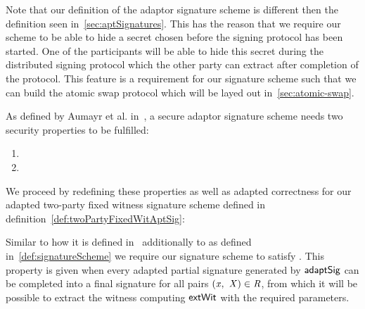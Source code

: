Note that our definition of the adaptor signature scheme is different then the definition seen in~\ref{sec:aptSignatures}. This has the reason that we require our scheme to be able to hide a secret chosen before
the signing protocol has been started. One of the participants will be able to hide this secret during the distributed signing protocol which the other party can extract after completion of the protocol. This feature
is a requirement for our signature scheme such that we can build the atomic swap protocol which will be layed out in~\ref{sec:atomic-swap}.

\begin{definition}[\cnstSecureAptScheme]
    \label{def:aptsigsecure}
    As defined by Aumayr et al. in~\cite{aumayr2020bitcoinchannels}, a secure adaptor signature scheme needs two security properties to be fulfilled:
    \begin{enumerate}
        \item \cnstaEUFCMA
        \item \cnstWitnessExtractability
    \end{enumerate}
\end{definition}

We proceed by redefining these properties as well as adapted correctness for our adapted two-party fixed witness signature scheme defined in definition~\ref{def:twoPartyFixedWitAptSig}:

Similar to how it is defined in~\cite{aumayr2020bitcoinchannels} additionally to \cnstCorrectness as defined in~\ref{def:signatureScheme} we require our signature scheme to satisfy \cnstAptSigCorrectness.
This property is given when every adapted partial signature generated by $\mathsf{adaptSig}$ can be completed into a final signature for all pairs $(\mathit{x} ,~ \mathit{X}) \in \mathit{R}$, from which it will
be possible to extract the witness computing $\mathsf{extWit}$ with the required parameters.


